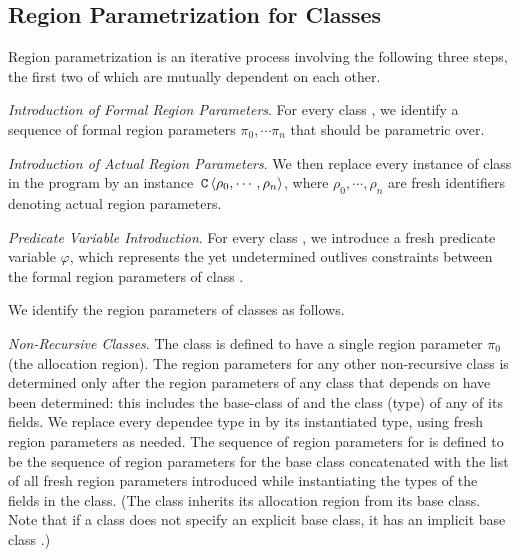 
\subsection{Region Parametrization for Classes}
\label{sec:fb-templatization}

Region parametrization is an iterative process involving the following three steps,
the first two of which are mutually dependent on each other.

\emph{Introduction of Formal Region Parameters}.
For every class , we identify a sequence of formal region parameters
$\pi_0, \cdots \pi_n$ that  should be parametric over.

\emph{Introduction of Actual Region Parameters}.
We then replace every instance of class  in the program by an instance
$\,{\tt C}\,\langle \rho_0, \cdots, \rho_n \rangle$, where $\rho_0, \cdots, \rho_n$
are fresh identifiers denoting actual region parameters.

\emph{Predicate Variable Introduction}. For every class , we introduce
a fresh predicate variable $\varphi$, which represents the yet undetermined
outlives constraints between the formal region parameters of class .

We identify the region parameters of classes as follows.

\emph{Non-Recursive Classes}.
The class  is defined to have a single region parameter $\pi_0$ (the allocation region).
The region parameters for any other non-recursive class  is determined
only after the region parameters of any class that  depends on have been
determined: this includes the base-class  of  and the class (type)
of any of its fields.
We replace every dependee type  in  by its instantiated type,
using fresh region parameters as needed.
The sequence of region parameters for  is defined to be
the sequence of region parameters for the base class  concatenated
with the list of all  fresh region parameters introduced while instantiating the types
of the fields in the class.
(The class inherits its allocation region from its base class. Note that if
a class does not specify an explicit base class, it has an implicit base class
.)

